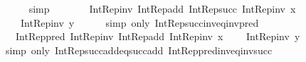 \begin{isabellebody}
\ \ \ \ \isamarkupfalse%
\ simp\isanewline
\ \ \isamarkupfalse%
\ \isamarkupfalse%
\ {\isachardoublequoteopen}{\isachardot}{\kern0pt}{\isachardot}{\kern0pt}{\isachardot}{\kern0pt}\ {\isacharequal}{\kern0pt}\ Int{\isacharunderscore}{\kern0pt}Rep{\isacharunderscore}{\kern0pt}inv\ {\isacharparenleft}{\kern0pt}Int{\isacharunderscore}{\kern0pt}Rep{\isacharunderscore}{\kern0pt}add\ {\isacharparenleft}{\kern0pt}Int{\isacharunderscore}{\kern0pt}Rep{\isacharunderscore}{\kern0pt}succ\ {\isacharparenleft}{\kern0pt}Int{\isacharunderscore}{\kern0pt}Rep{\isacharunderscore}{\kern0pt}inv\ x{\isacharparenright}{\kern0pt}{\isacharparenright}{\kern0pt}\isanewline
\ \ \ \ {\isacharparenleft}{\kern0pt}Int{\isacharunderscore}{\kern0pt}Rep{\isacharunderscore}{\kern0pt}inv\ y{\isacharparenright}{\kern0pt}{\isacharparenright}{\kern0pt}{\isachardoublequoteclose}\isanewline
\ \ \ \ \isamarkupfalse%
\ {\isacharparenleft}{\kern0pt}simp\ only{\isacharcolon}{\kern0pt}\ Int{\isacharunderscore}{\kern0pt}Rep{\isacharunderscore}{\kern0pt}succ{\isacharunderscore}{\kern0pt}inv{\isacharunderscore}{\kern0pt}eq{\isacharunderscore}{\kern0pt}inv{\isacharunderscore}{\kern0pt}pred{\isacharparenright}{\kern0pt}\isanewline
\ \ \isamarkupfalse%
\ \isamarkupfalse%
\ {\isachardoublequoteopen}{\isachardot}{\kern0pt}{\isachardot}{\kern0pt}{\isachardot}{\kern0pt}\ {\isacharequal}{\kern0pt}\ Int{\isacharunderscore}{\kern0pt}Rep{\isacharunderscore}{\kern0pt}pred\ {\isacharparenleft}{\kern0pt}Int{\isacharunderscore}{\kern0pt}Rep{\isacharunderscore}{\kern0pt}inv\ {\isacharparenleft}{\kern0pt}Int{\isacharunderscore}{\kern0pt}Rep{\isacharunderscore}{\kern0pt}add\ {\isacharparenleft}{\kern0pt}Int{\isacharunderscore}{\kern0pt}Rep{\isacharunderscore}{\kern0pt}inv\ x{\isacharparenright}{\kern0pt}\isanewline
\ \ \ \ {\isacharparenleft}{\kern0pt}Int{\isacharunderscore}{\kern0pt}Rep{\isacharunderscore}{\kern0pt}inv\ y{\isacharparenright}{\kern0pt}{\isacharparenright}{\kern0pt}{\isacharparenright}{\kern0pt}{\isachardoublequoteclose}\isanewline
\ \ \ \ \isamarkupfalse%
\ {\isacharparenleft}{\kern0pt}simp\ only{\isacharcolon}{\kern0pt}\ Int{\isacharunderscore}{\kern0pt}Rep{\isacharunderscore}{\kern0pt}succ{\isacharunderscore}{\kern0pt}add{\isacharunderscore}{\kern0pt}eq{\isacharunderscore}{\kern0pt}succ{\isacharunderscore}{\kern0pt}add\ Int{\isacharunderscore}{\kern0pt}Rep{\isacharunderscore}{\kern0pt}pred{\isacharunderscore}{\kern0pt}inv{\isacharunderscore}{\kern0pt}eq{\isacharunderscore}{\kern0pt}inv{\isacharunderscore}{\kern0pt}succ{\isacharparenright}{\kern0pt}\isanewline

\end{isabellebody}
